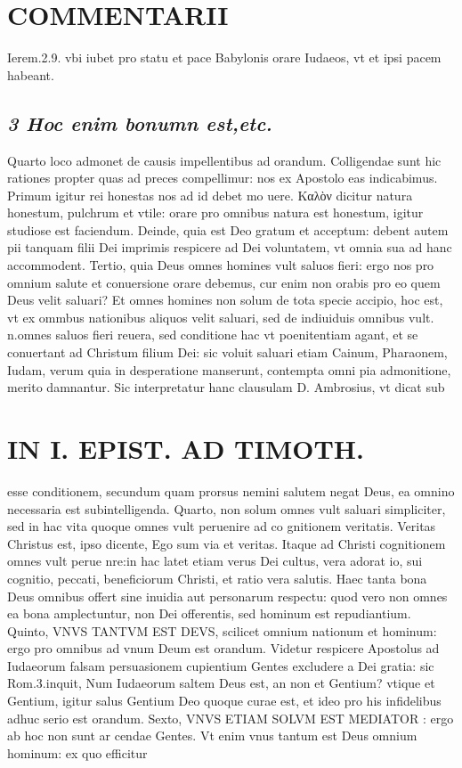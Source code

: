 \documentclass{article}
\begin{document}
\begin{pages}
\section*{COMMENTARII }
\marginpar{[ p.48 ]}\pstart Ierem.2.9. vbi iubet pro statu et pace Babylonis orare Iudaeos, vt et ipsi pacem habeant.  \pend
{}
{}
\subsection*{\textit{3 Hoc enim bonumn est,etc. }}\pstart Quarto loco admonet de causis impellentibus ad orandum. Colligendae sunt hic rationes propter quas ad preces compellimur: nos ex Apostolo eas indicabimus. Primum igitur rei honestas nos ad id debet mo uere. Καλὸν dicitur natura honestum, pulchrum et vtile: orare pro omnibus natura est honestum, igitur studiose est faciendum. Deinde, quia est Deo gratum et acceptum: debent autem pii tanquam filii Dei imprimis respicere ad Dei voluntatem, vt omnia sua ad hanc accommodent. Tertio, quia Deus omnes homines vult saluos fieri: ergo nos pro omnium salute et conuersione orare debemus, cur enim non orabis pro eo quem Deus velit saluari? Et omnes homines non solum de tota specie accipio, hoc est, vt ex ommbus  nationibus  aliquos velit saluari, sed de indiuiduis omnibus  vult. n.omnes saluos fieri reuera, sed conditione hac vt poenitentiam agant, et se conuertant ad Christum filium Dei: sic voluit saluari etiam Cainum, Pharaonem, Iudam, verum quia in desperatione manserunt, contempta omni pia admonitione, merito damnantur. Sic interpretatur hanc clausulam D. Ambrosius, vt dicat sub\pend
\section*{IN I. EPIST. AD TIMOTH. }
\marginpar{[ p.49 ]}\pstart esse conditionem, secundum quam prorsus nemini salutem negat Deus, ea omnino necessaria est subintelligenda. Quarto, non solum omnes vult saluari simpliciter, sed in hac vita quoque omnes vult peruenire ad co gnitionem veritatis. Veritas Christus est, ipso dicente, Ego sum via et veritas. Itaque ad Christi cognitionem omnes vult perue nre:in hac latet etiam verus Dei cultus, vera adorat io, sui cognitio, peccati, beneficiorum Christi, et ratio vera salutis. Haec tanta bona Deus omnibus offert sine inuidia aut personarum respectu: quod vero non omnes ea bona amplectuntur, non Dei offerentis, sed hominum est repudiantium.  \pend\pstart Quinto, VNVS TANTVM EST DEVS, scilicet omnium nationum et hominum: ergo pro omnibus ad vnum Deum est orandum. Videtur respicere Apostolus ad Iudaeorum falsam persuasionem cupientium Gentes excludere a Dei gratia: sic Rom.3.inquit, Num Iudaeorum saltem Deus est, an non et Gentium? vtique et Gentium, igitur salus Gentium Deo quoque curae est, et ideo pro his infidelibus adhuc serio est orandum. Sexto, VNVS ETIAM SOLVM EST MEDIATOR : ergo ab hoc non sunt ar cendae Gentes. Vt enim vnus tantum est Deus omnium hominum: ex quo efficitur  \pend

\end{pages}
\end{document}
